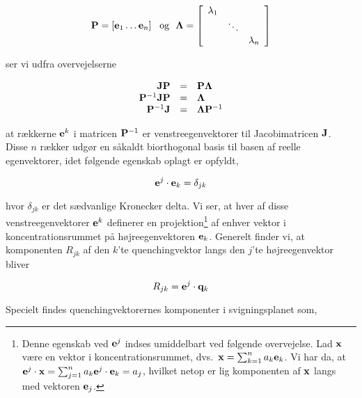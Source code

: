\begin{equation}
 {\bf P} = \left[{\bf e}_1\ldots{\bf e}_n\right]
 \mbox{\ \ og\ \ }
 {\bf \Lambda} = 
 \left[
 \begin{array}{ccc}
  \lambda_1 & & \\
  & \ddots &    \\
  & & \lambda_n 
  \end{array}
 \right] 
\end{equation}

ser vi udfra overvejelserne

\begin{equation}
 \begin{array}{rcl}
             {\bf J}{\bf P} & = &             {\bf P}{\bf \Lambda}\\
 {\bf P}^{-1}{\bf J}{\bf P} & = &                    {\bf \Lambda}\\
 {\bf P}^{-1}{\bf J}        & = & {\bf \Lambda}{\bf P}^{-1}
 \end{array}
\end{equation}

at r{\ae}kkerne ${\bf e}^k$ i matricen ${\bf P}^{-1}$ er 
venstreegenvektorer til Jacobimatricen $\bf J$. Disse $n$ r{\ae}kker 
udg{\o}r en s{\aa}kaldt biorthogonal basis til basen af reelle
egenvektorer, idet f{\o}lgende egenskab oplagt er opfyldt,

\begin{equation}
{\bf e}^j \cdot {\bf e}_k = \delta_{jk}
\label{eq:kronecker}
\end{equation}

hvor $\delta_{jk}$ er det s{\ae}dvanlige Kronecker delta.
Vi ser, at hver af disse venstre\-egenvektorer ${\bf e}^k$
definerer en projektion\footnote{Denne egenskab ved ${\bf
e}^j$ indses umiddelbart ved f{\o}lgende overvejelse. Lad
${\bf x}$ v{\ae}re en vektor i koncentrationsrummet, dvs.\
${\bf x} = \sum_{k=1}^n a_k{\bf e}_k$. Vi har da, at ${\bf
e}^j \cdot {\bf x} = \sum_{j=1}^n a_k {\bf e}^j \cdot {\bf
e}_k = a_j$, hvilket netop er lig komponenten af ${\bf x}$
langs med vektoren ${\bf e}_j$.} af enhver vektor i
koncentrationsrummet p{\aa} h{\o}jreegenvektoren ${\bf
e}_k$. Generelt finder vi, at komponenten $R_{jk}$ af den
$k$'te quenchingvektor langs den $j$'te h{\o}jreegenvektor
bliver

\begin{equation}
 R_{jk} = {\bf e}^j \cdot {\bf q}_k 
\end{equation}

Specielt findes quenchingvektorernes komponenter i 
svigningsplanet som,

